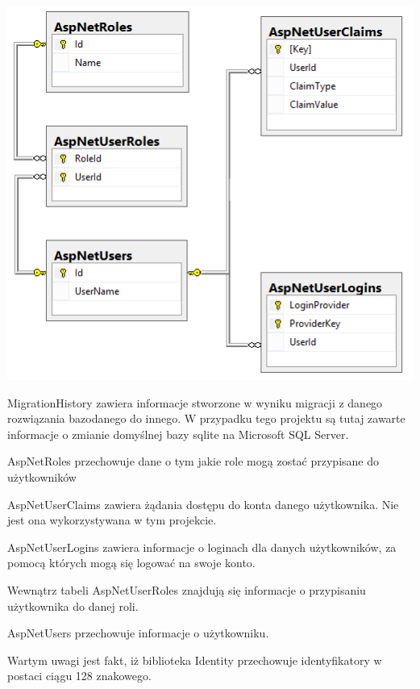 \newpage
\begin{center}
\includegraphics{images/identity.png}
\end{center}


\textunderscore\textunderscore MigrationHistory zawiera informacje stworzone w wyniku migracji z danego rozwiązania bazodanego do innego. W przypadku tego projektu są tutaj zawarte informacje o zmianie domyślnej bazy sqlite na Microsoft SQL Server.

AspNetRoles przechowuje dane o tym jakie role mogą zostać przypisane do użytkowników

AspNetUserClaims zawiera żądania dostępu do konta danego użytkownika. Nie jest ona wykorzystywana w tym projekcie.

AspNetUserLogins zawiera informacje o loginach dla danych użytkowników, za pomocą których mogą się logować na swoje konto.

Wewnątrz tabeli AspNetUserRoles znajdują się informacje o przypisaniu użytkownika do danej roli.

AspNetUsers przechowuje informacje o użytkowniku.

\vspace{5mm}

Wartym uwagi jest fakt, iż biblioteka Identity przechowuje identyfikatory w postaci ciągu 128 znakowego.

 
